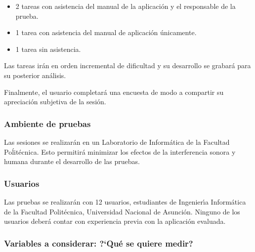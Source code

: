 \begin{itemize}
    \item 2 tareas con asistencia del manual de la aplicaci\'on y el responsable de la prueba.
    \item 1 tarea con asistencia del manual de aplicaci\'on \'unicamente.
    \item 1 tarea sin asistencia.
\end{itemize}

Las tareas ir\'an en orden incremental de dificultad y su desarrollo se grabar\'a para su posterior 
an\'alisis.

Finalmente, el usuario completará una encuesta de modo a compartir su apreciación subjetiva de la sesión.

\subsubsection{Ambiente de pruebas}
Las sesiones se realizarán en un Laboratorio de Inform\'atica de la Facultad Poĺit\'ecnica. Esto
permitirá minimizar los efectos de la interferencia sonora y humana durante el
desarrollo de las pruebas.

\subsubsection{Usuarios}
Las pruebas se realizarán con 12 usuarios, estudiantes de Ingenier{\'\i}a Inform\'atica
de la Facultad Polit\'ecnica, Universidad Nacional de Asunci\'on. Ninguno de los usuarios 
deberá contar con experiencia previa con la aplicación evaluada.

\subsubsection{Variables a considerar: {?`}Qu\'e se quiere medir?}

